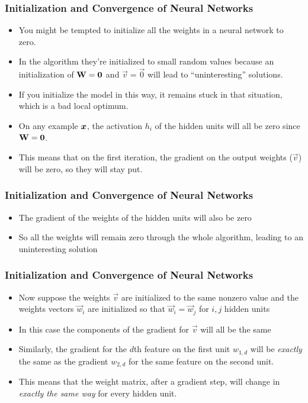 \documentclass[trans]{beamer}
\begin{document}

\begin{frame}
  \frametitle{Initialization and Convergence of Neural Networks}
\begin{itemize}
\item
You might be tempted to
initialize all the weights in a neural network to zero. 
\item  In the algorithm they're initialized to small random values 
because an initialization of $\text{\bf W} = \text{\bf 0}$ and $\vec
v = \vec 0$ will lead to ``uninteresting'' solutions.  
\item If you initialize the model in this way, it remains stuck
in that situation, which is a bad local optimum.  
\item On any
example ${\boldsymbol{x}}$, the activation $h_i$ of the hidden units will all be
zero since $\text{\bf W} = \text{\bf 0}$. 
\item This means that on the first iteration,
the gradient on the output weights ($\vec v$) will be zero, so they
will stay put. 
\end{itemize}
\end{frame}

\begin{frame}
  \frametitle{Initialization and Convergence of Neural Networks}
\begin{itemize}
\item The gradient of the weights of the hidden units will also be zero
\item So 
all the weights will remain  zero through the whole algorithm, leading to 
an uninteresting solution
\end{itemize}
\end{frame}

\begin{frame}
  \frametitle{Initialization and Convergence of Neural Networks}
\begin{itemize}
\item Now suppose the weights $\vec v$ are initialized to the same nonzero value and the weights 
vectors $\vec w_i$ are initialized
so that $\vec w_i=\vec w_j$ for $i,j$ hidden units
\item In this case the components of the gradient for $\vec v$ will all be the same 
\item Similarly, the gradient for the $d$th
feature on the first unit $w_{1,d}$ will be \emph{exactly} the same as the
gradient $w_{2,d}$ for the same feature on the second unit.  
\item This
means that the weight matrix, after a gradient step, will change in
\emph{exactly the same way} for every hidden unit. 
\end{itemize}
\end{frame}
\end{document}
